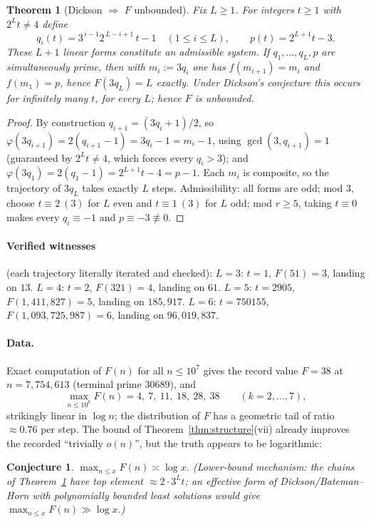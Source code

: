 \documentclass[11pt,a4paper]{article}
\newtheorem{theorem}{Theorem}
\newtheorem{conjecture}{Conjecture}
\theoremstyle{remark}
\begin{document}
\begin{theorem}[Dickson $\Rightarrow$ $F$ unbounded]\label{thm:dickson}
Fix $L\ge 1$. For integers $t\ge 1$ with $2^Lt\ne 4$ define
\[
q_i(t)=3^{\,i-1}2^{\,L-i+1}\,t-1\quad(1\le i\le L),\qquad p(t)=2^{L+1}t-3.
\]
These $L+1$ linear forms constitute an admissible system. If $q_1,\dots,q_L,p$ are simultaneously prime, then with $m_i:=3q_i$ one has $f(m_{i+1})=m_i$ and $f(m_1)=p$, hence $F(3q_L)=L$ exactly. Under Dickson's conjecture \cite{Dickson} this occurs for infinitely many $t$, for every $L$; hence $F$ is unbounded.
\end{theorem}

\begin{proof}
By construction $q_{i+1}=(3q_i+1)/2$, so $\varphi(3q_{i+1})=2(q_{i+1}-1)=3q_i-1=m_i-1$, using $\gcd(3,q_{i+1})=1$ (guaranteed by $2^Lt\ne 4$, which forces every $q_i>3$); and $\varphi(3q_1)=2(q_1-1)=2^{L+1}t-4=p-1$. Each $m_i$ is composite, so the trajectory of $3q_L$ takes exactly $L$ steps. Admissibility: all forms are odd; mod $3$, choose $t\equiv 2\ (3)$ for $L$ even and $t\equiv 1\ (3)$ for $L$ odd; mod $r\ge 5$, taking $t\equiv 0$ makes every $q_i\equiv -1$ and $p\equiv -3\not\equiv 0$.
\end{proof}

\paragraph{Verified witnesses} (each trajectory literally iterated and checked): $L=3$: $t=1$, $F(51)=3$, landing on $13$. $L=4$: $t=2$, $F(321)=4$, landing on $61$. $L=5$: $t=2905$, $F(1{,}411{,}827)=5$, landing on $185{,}917$. $L=6$: $t=750155$, $F(1{,}093{,}725{,}987)=6$, landing on $96{,}019{,}837$.

\paragraph{Data.} Exact computation of $F(n)$ for all $n\le 10^7$ gives the record value $F=38$ at $n=7{,}754{,}613$ (terminal prime $30689$), and
\[
\max_{n\le 10^k}F(n)=4,\ 7,\ 11,\ 18,\ 28,\ 38\qquad(k=2,\dots,7),
\]
strikingly linear in $\log n$; the distribution of $F$ has a geometric tail of ratio $\approx 0.76$ per step. The bound of Theorem~\ref{thm:structure}(vii) already improves the recorded ``trivially $o(n)$'', but the truth appears to be logarithmic:

\begin{conjecture}\label{conj:log}
$\max_{n\le x}F(n)\asymp\log x$. (Lower-bound mechanism: the chains of Theorem~\ref{thm:dickson} have top element $\approx 2\cdot 3^L t$; an effective form of Dickson/Bateman--Horn with polynomially bounded least solutions would give $\max_{n\le x}F(n)\gg\log x$.)
\end{conjecture}
\end{document}
